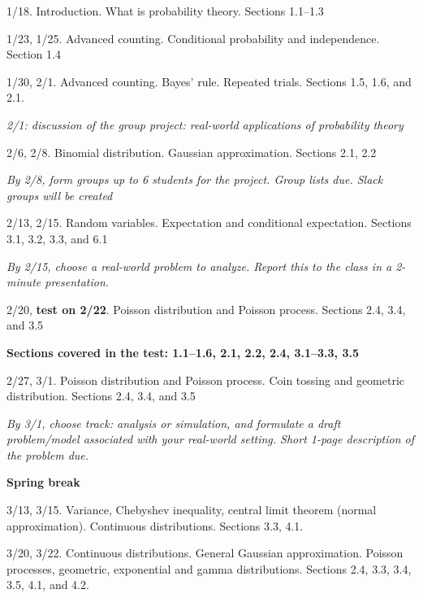 \documentclass[oneside,11pt]{amsart}
\begin{document}
\begin{enumerate}[\bf{}{[}week 1{]}]
	\item 1/18. Introduction. What is probability theory. Sections 1.1--1.3

	\item 1/23, 1/25. Advanced counting. Conditional probability and independence. Section 1.4

	\item 1/30, 2/1. Advanced counting. Bayes' rule. Repeated trials. Sections 1.5, 1.6, and 2.1.

		\emph{2/1: discussion of the group project: real-world applications of probability theory}
		
	\item 2/6, 2/8. Binomial distribution. Gaussian approximation. Sections 2.1, 2.2

		\emph{By 2/8, form groups up to 6 students for the project. Group lists due. Slack groups will be created}

	\item 2/13, 2/15. Random variables. Expectation and conditional expectation. Sections 3.1, 3.2, 3.3, and 6.1

		\emph{By 2/15, choose a real-world problem to analyze. Report this to the class in a 2-minute presentation.}

	\item 2/20, \textbf{test on 2/22}. Poisson distribution and Poisson process. Sections 2.4, 3.4, and 3.5

		\textbf{Sections covered in the test: 1.1--1.6, 2.1, 2.2, 2.4, 3.1--3.3, 3.5}

	\item 2/27, 3/1. Poisson distribution and Poisson process. Coin tossing and geometric distribution. 
		Sections 2.4, 3.4, and 3.5
		
		\emph{By 3/1, choose track: analysis or simulation, and formulate a draft problem/model 
		associated with your real-world setting.
		Short 1-page description of the problem due.}

		\textbf{Spring break}

	\item 3/13, 3/15. 
		Variance, Chebyshev inequality, central limit theorem (normal approximation).
		Continuous distributions.
		Sections 3.3, 4.1.

	\item 3/20, 3/22. Continuous distributions. General Gaussian approximation. 
		Poisson processes, geometric, exponential and gamma distributions. Sections 2.4, 3.3, 3.4, 3.5, 4.1, and 4.2.


\end{enumerate}
\end{document}
